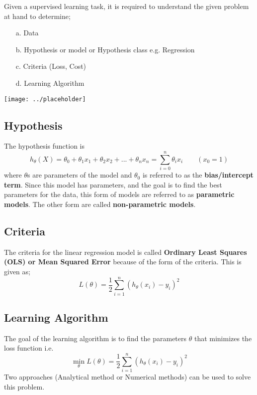 \documentclass[12pt,a4paper,titlepage,landscape]{book}
\begin{document}
	Given a supervised learning task, it is required to understand the given problem at hand to determine; \\
	\begin{enumerate}
		\item [a.] Data
		\item [b.] Hypothesis or model or Hypothesis class e.g. Regression
		\item [c.] Criteria (Loss, Cost)
		\item[d.] Learning Algorithm
	\end{enumerate}
\begin{center}
	\texttt{[image: ../placeholder]}
\end{center}
	
	\subsection{Hypothesis}
	The hypothesis function is \\
	\begin{equation}
		h_{\theta}(X) = \theta_0 + \theta_1x_1 + \theta_2x_2 + ... + \theta_nx_n
		= \sum_{i=0}^{n}\theta_ix_i \qquad (x_0=1)
	\end{equation}
	where $\theta$s are parameters of the model and $\theta_0$ is referred to as the \textbf{bias/intercept term}. Since this model has parameters, and the goal is to find the best parameters for the data, this form of models are referred to as \textbf{parametric models}. The other form are called \textbf{non-parametric models}.
	
	\subsection{Criteria}
	The criteria for the linear regression model is called \textbf{Ordinary Least Squares (OLS) or Mean Squared Error} because of the form of the criteria.  This is given as;
	\begin{equation}\label{loss_function}
	L(\theta) = \dfrac{1}{2}\sum_{i=1}^{n}\left(h_\theta(x_i) - y_i\right)^2
	\end{equation}
	
	\subsection{Learning Algorithm}
	The goal of the learning algorithm is to find the parameters $\theta$ that minimizes the loss function i.e. \\ $$ \min\limits_{\theta}L(\theta) = \dfrac{1}{2}\sum_{i=1}^{n}\left(h_\theta(x_i) - y_i\right)^2 $$
	Two approaches (Analytical method or Numerical methods) can be used to solve this problem.
	
\end{document}
